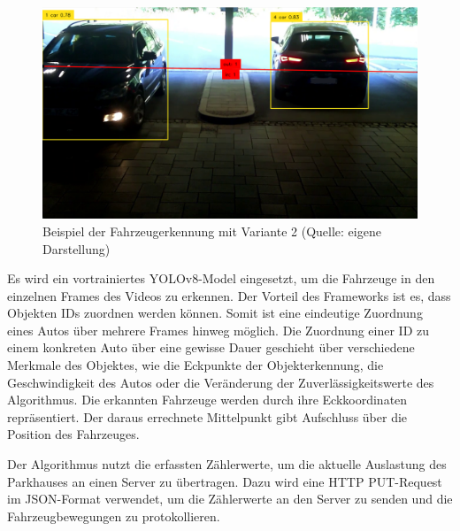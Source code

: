 \begin{figure}[h]
	\myImagePos{}
	\includegraphics[width=\myImageWidth]{Bilder/Method3_Beispiel.png}
	\caption[Fahrzeugerkennung Variante 2 Beispiel]{Beispiel der Fahrzeugerkennung mit Variante 2 (Quelle: eigene Darstellung)}
	\label{fig:Variante2}
\end{figure}

Es wird ein vortrainiertes YOLOv8-Model eingesetzt, um die Fahrzeuge in den einzelnen Frames des Videos zu erkennen.
Der Vorteil des Frameworks ist es, dass Objekten IDs zuordnen werden können.
Somit ist eine eindeutige Zuordnung eines Autos über mehrere Frames hinweg möglich.
Die Zuordnung einer ID zu einem konkreten Auto über eine gewisse Dauer geschieht über verschiedene Merkmale des Objektes, wie die Eckpunkte der Objekterkennung, die Geschwindigkeit des Autos oder die Veränderung der Zuverlässigkeitswerte des Algorithmus.
Die erkannten Fahrzeuge werden durch ihre Eckkoordinaten repräsentiert.
Der daraus errechnete Mittelpunkt gibt Aufschluss über die Position des Fahrzeuges.

Der Algorithmus nutzt die erfassten Zählerwerte, um die aktuelle Auslastung des Parkhauses an einen Server zu übertragen.
Dazu wird eine HTTP PUT-Request im JSON-Format verwendet, um die Zählerwerte an den Server zu senden und die Fahrzeugbewegungen zu protokollieren.